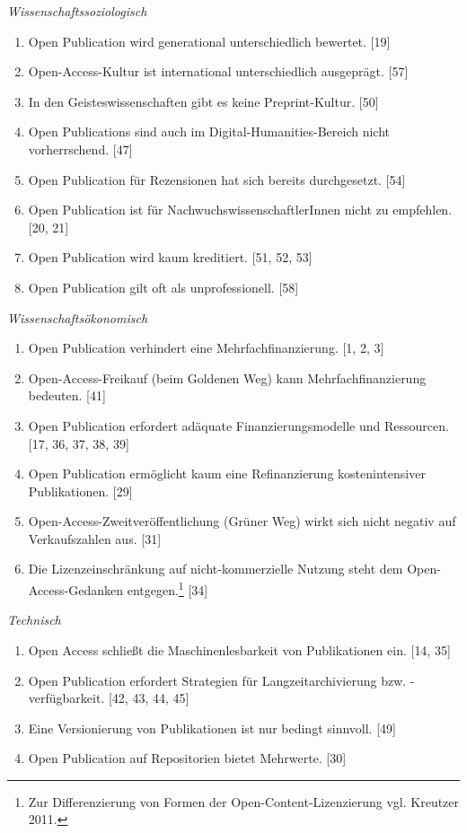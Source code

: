 \documentclass[a4paper,
fontsize=11pt,
oneside,
numbers=noperiodatend,
parskip=half-,
bibliography=totoc,
final
]{scrartcl}
\begin{document}
\pagebreak
\emph{Wissenschaftssoziologisch}

\begin{enumerate}
\def\labelenumi{(\arabic{enumi})}
\item
  Open Publication wird generational unterschiedlich bewertet. {[}19{]}
\item
  Open-Access-Kultur ist international unterschiedlich ausgeprägt. {[}57{]}
\item
  In den Geisteswissenschaften gibt es keine Preprint-Kultur. {[}50{]}
\item
  Open Publications sind auch im Digital-Humanities-Bereich nicht vorherrschend. {[}47{]}
\item
  Open Publication für Rezensionen hat sich bereits durchgesetzt. {[}54{]}
\item
  Open Publication ist für NachwuchswissenschaftlerInnen nicht zu empfehlen. {[}20, 21{]}
\item
  Open Publication wird kaum kreditiert. {[}51, 52, 53{]}
\item
  Open Publication gilt oft als unprofessionell. {[}58{]}
\end{enumerate}

\emph{Wissenschaftsökonomisch}

\begin{enumerate}
\def\labelenumi{(\arabic{enumi})}
\item
  Open Publication verhindert eine Mehrfachfinanzierung. {[}1, 2, 3{]}
\item
  Open-Access-Freikauf (beim Goldenen Weg) kann Mehrfachfinanzierung bedeuten. {[}41{]}
\item
  Open Publication erfordert adäquate Finanzierungsmodelle und Ressourcen. {[}17, 36, 37, 38, 39{]}
\item
  Open Publication ermöglicht kaum eine Refinanzierung kostenintensiver Publikationen. {[}29{]}
\item
  Open-Access-Zweitveröffentlichung (Grüner Weg) wirkt sich nicht negativ auf Verkaufszahlen aus. {[}31{]}
\item
  Die Lizenzeinschränkung auf nicht-kommerzielle Nutzung steht dem Open-Access-Ge\-danken entgegen.\footnote{Zur
    Differenzierung von Formen der Open-Content-Lizenzierung vgl.
    Kreutzer 2011.} {[}34{]}
\end{enumerate}

\emph{Technisch}

\begin{enumerate}
\def\labelenumi{(\arabic{enumi})}
\item
  Open Access schließt die Maschinenlesbarkeit von Publikationen ein. {[}14, 35{]}
\item
  Open Publication erfordert Strategien für Langzeitarchivierung bzw. -verfügbarkeit. {[}42, 43, 44, 45{]}
\item
  Eine Versionierung von Publikationen ist nur bedingt sinnvoll. {[}49{]}
\item
  Open Publication auf Repositorien bietet Mehrwerte. {[}30{]}
\end{enumerate}
\end{document}
